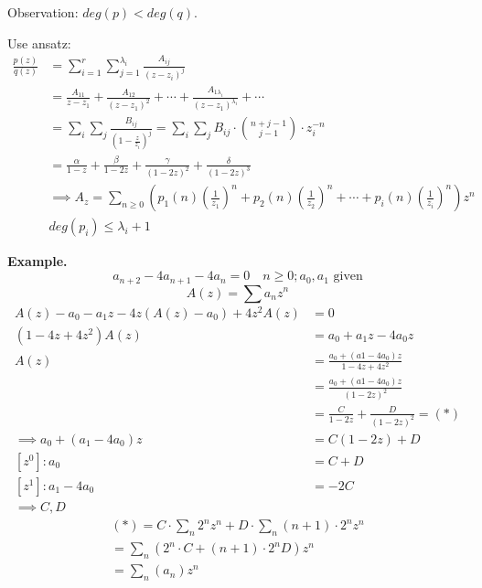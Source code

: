 Observation: $deg(p) < deg(q)$.

Use ansatz:
\begin{align*}
\frac{p(z)}{q(z)} &= \sum_{i=1}^{r} \sum_{j=1}^{\lambda_i} \frac{A_{ij}}{(z-z_i)^j} \\
&= \frac{A_{11}}{z-z_1} + \frac{A_{12}}{(z-z_1)^2} + \cdots + \frac{A_{1\lambda_i}}{(z-z_1)^{\lambda_i}} + \cdots \\
&= \sum_i\sum_j \frac{B_{ij}}{\left(1-\frac{z}{z_i}\right)^j}= \sum_i\sum_j B_{ij} \cdot \binom {n+j-1}{j-1} \cdot z_i^{-n}\\
&= \frac{\alpha}{1-z} + \frac{\beta}{1-2z} + \frac{\gamma}{(1-2z)^2} + \frac{\delta}{(1-2z)^3}\\
&\implies A_z = \sum_{n\geq 0}\left(p_1(n) \left( \frac{1}{z_1} \right)^n + p_2(n) \left( \frac{1}{z_2} \right)^n + \cdots + p_i(n) \left( \frac{1}{z_i} \right)^n \right)z^n \\
&deg(p_i) \leq \lambda_i + 1
\end{align*}

\textbf{Example.}
\[
    a_{n+2} - 4 a_{n+1} - 4 a_n = 0 \quad n ≥ 0;  a_0, a_1 \text{ given}
\]
\[
    A(z) = \sum a_n z^n
\]
\begin{align*}
    A(z) - a_0 - a_1 z - 4z (A(z)-a_0) + 4z^2 A(z) &= 0 \\
    (1-4z + 4z^2) A(z) &= a_0 + a_1 z - 4a_0 z \\
    A(z) &= \frac{a_0 + (a1 - 4a_0)z}{1- 4z + 4z^2}\\
    &= \frac{a_0 + (a1 - 4a_0)z}{(1-2z)^2}\\
    &= \frac{C}{1-2z} + \frac{D}{(1-2z)^2} = (*)\\
    \implies a_0 + (a_1 - 4a_0)z &= C (1-2z) + D \\
    [z^0]: a_0 &= C+D \\
    [z^1]: a_1 - 4a_0 &= -2C \\
    \implies C, D
\end{align*}
\begin{align*}
    (*) = C \cdot \sum_n 2^n z^n + D \cdot \sum_n (n+1) \cdot 2^n z^n \\
    = \sum_n \left(2^n \cdot C + (n+1)\cdot 2^n D\right) z^n \\
    = \sum_n (a_n) z^n
\end{align*}


